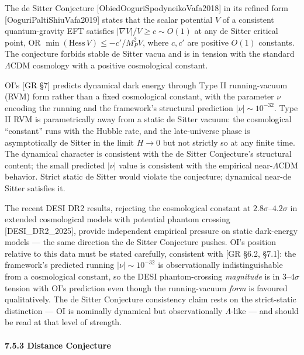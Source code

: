\documentclass[
]{article}
\begin{document}
The de Sitter Conjecture {[}ObiedOoguriSpodyneikoVafa2018{]} in its
refined form {[}OoguriPaltiShiuVafa2019{]} states that the scalar
potential \(V\) of a consistent quantum-gravity EFT satisfies
\(|\nabla V|/V \geq c \sim O(1)\) at any de Sitter critical point, OR
\(\min(\text{Hess}\,V) \leq -c'/M_P^2 V\), where \(c, c'\) are positive
\(O(1)\) constants. The conjecture forbids stable de Sitter vacua and is
in tension with the standard \(\Lambda\)CDM cosmology with a positive
cosmological constant.

OI's {[}GR §7{]} predicts dynamical dark energy through Type II
running-vacuum (RVM) form rather than a fixed cosmological constant,
with the parameter \(\nu\) encoding the running and the framework's
structural prediction \(|\nu| \sim 10^{-32}\). Type II RVM is
parametrically away from a static de Sitter vacuum: the cosmological
``constant'' runs with the Hubble rate, and the late-universe phase is
asymptotically de Sitter in the limit \(H \to 0\) but not strictly so at
any finite time. The dynamical character is consistent with the de
Sitter Conjecture's structural content; the small predicted \(|\nu|\)
value is consistent with the empirical near-\(\Lambda\)CDM behavior.
Strict static de Sitter would violate the conjecture; dynamical near-de
Sitter satisfies it.

The recent DESI DR2 results, rejecting the cosmological constant at
\(2.8\sigma\)--\(4.2\sigma\) in extended cosmological models with
potential phantom crossing {[}DESI\_DR2\_2025{]}, provide independent
empirical pressure on static dark-energy models --- the same direction
the de Sitter Conjecture pushes. OI's position relative to this data
must be stated carefully, consistent with {[}GR §6.2, §7.1{]}: the
framework's predicted running \(|\nu| \sim 10^{-32}\) is observationally
indistinguishable from a cosmological constant, so the DESI
phantom-crossing \emph{magnitude} is in 3--4\(\sigma\) tension with OI's
prediction even though the running-vacuum \emph{form} is favoured
qualitatively. The de Sitter Conjecture consistency claim rests on the
strict-static distinction --- OI is nominally dynamical but
observationally \(\Lambda\)-like --- and should be read at that level of
strength.

\hypertarget{distance-conjecture}{%
\paragraph{7.5.3 Distance Conjecture}\label{distance-conjecture}}
\end{document}
